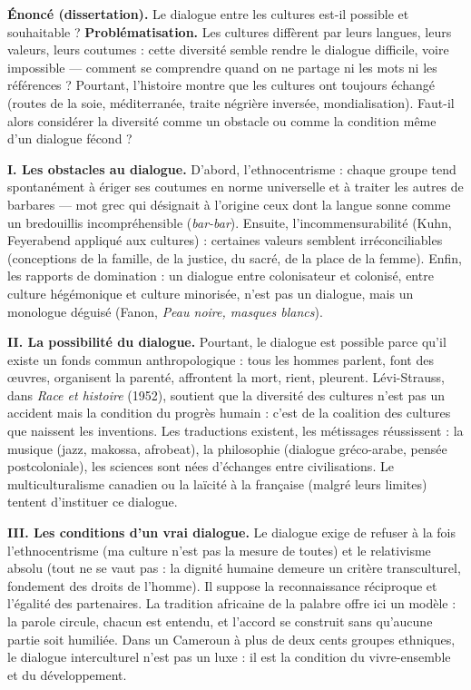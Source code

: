 \documentclass[11pt]{article}
\newcommand{\cle}[1]{{\popxbold\color{popdark}#1}}
\begin{document}
\begin{exoresolu}
\textbf{Énoncé (dissertation).} Le dialogue entre les cultures est-il possible et souhaitable ?
\tcblower
\textbf{Problématisation.} Les cultures diffèrent par leurs langues, leurs valeurs, leurs coutumes : cette diversité semble rendre le dialogue difficile, voire impossible — comment se comprendre quand on ne partage ni les mots ni les références ? Pourtant, l'histoire montre que les cultures ont toujours échangé (routes de la soie, méditerranée, traite négrière inversée, mondialisation). Faut-il alors considérer la diversité comme un obstacle ou comme la condition même d'un dialogue fécond ?

\textbf{I. Les obstacles au dialogue.} D'abord, l'\cle{ethnocentrisme} : chaque groupe tend spontanément à ériger ses coutumes en norme universelle et à traiter les autres de \guillemotleft barbares \guillemotright — mot grec qui désignait à l'origine ceux dont la langue sonne comme un bredouillis incompréhensible (\emph{bar-bar}). Ensuite, l'\cle{incommensurabilité} (Kuhn, Feyerabend appliqué aux cultures) : certaines valeurs semblent irréconciliables (conceptions de la famille, de la justice, du sacré, de la place de la femme). Enfin, les \cle{rapports de domination} : un dialogue entre colonisateur et colonisé, entre culture hégémonique et culture minorisée, n'est pas un dialogue, mais un monologue déguisé (Fanon, \emph{Peau noire, masques blancs}).

\textbf{II. La possibilité du dialogue.} Pourtant, le dialogue est possible parce qu'il existe un \cle{fonds commun} anthropologique : tous les hommes parlent, font des œuvres, organisent la parenté, affrontent la mort, rient, pleurent. Lévi-Strauss, dans \emph{Race et histoire} (1952), soutient que la diversité des cultures n'est pas un accident mais la condition du progrès humain : c'est de la \guillemotleft coalition \guillemotright des cultures que naissent les inventions. Les traductions existent, les métissages réussissent : la musique (jazz, makossa, afrobeat), la philosophie (dialogue gréco-arabe, pensée postcoloniale), les sciences sont nées d'échanges entre civilisations. Le \cle{multiculturalisme} canadien ou la \cle{laïcité} à la française (malgré leurs limites) tentent d'instituer ce dialogue.

\textbf{III. Les conditions d'un vrai dialogue.} Le dialogue exige de refuser à la fois l'ethnocentrisme (ma culture n'est pas la mesure de toutes) et le relativisme absolu (tout ne se vaut pas : la \cle{dignité humaine} demeure un critère transculturel, fondement des droits de l'homme). Il suppose la \cle{reconnaissance réciproque} et l'\cle{égalité des partenaires}. La tradition africaine de la palabre offre ici un modèle : la parole circule, chacun est entendu, et l'accord se construit sans qu'aucune partie soit humiliée. Dans un Cameroun à plus de deux cents groupes ethniques, le dialogue interculturel n'est pas un luxe : il est la condition du \cle{vivre-ensemble} et du développement.


\end{exoresolu}
\end{document}
